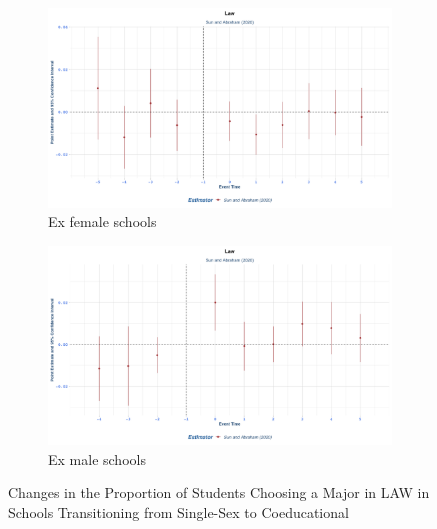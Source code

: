 \begin{figure}[H]
    \centering
    \begin{subfigure}[b]{0.45\textwidth}
        \centering
        \includegraphics[width=\textwidth]{Graph/Results/stagered_ex_females_LAW.png}
        \caption{Ex female schools }
        \label{fig:staggered_females_education_sciences}
    \end{subfigure}
    \hfill
    \begin{subfigure}[b]{0.45\textwidth}
        \centering
        \includegraphics[width=\textwidth]{Graph/Results/stagered_ex_males_LAW.png}
        \caption{Ex male schools}
        \label{fig:staggered_males_education_sciences}
    \end{subfigure}
       \caption{ Changes in the Proportion of Students Choosing  a Major in LAW in Schools Transitioning from Single-Sex to Coeducational}
    \label{fig:staggered_education_sciences}
\end{figure}

